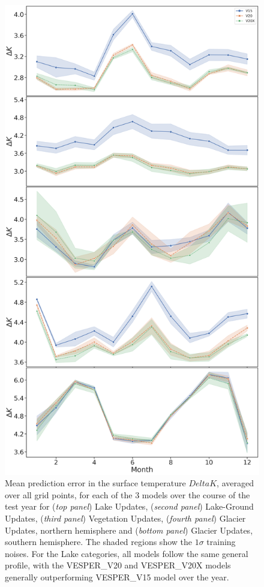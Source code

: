 \documentclass[hess, twostagejnl]{copernicus}
\begin{document}
	\begin{figure}
	\includegraphics[scale=0.2]{new_timeseries_noise}
	\caption{Mean prediction error in the surface temperature $Delta K$, averaged over all grid points, for each of the 3 models over the course of the test year for (\textit{top panel}) Lake Updates, (\textit{second panel}) Lake-Ground Updates, (\textit{third panel}) Vegetation Updates, (\textit{fourth panel}) Glacier Updates, northern hemisphere and (\textit{bottom panel}) Glacier Updates, southern hemisphere. The shaded regions show the $1 \sigma$ training noises. For the Lake categories, all models follow the same general profile, with the VESPER\_V20 and VESPER\_V20X models generally outperforming VESPER\_V15 model over the year.}
	\label{fig:timeseries}
\end{figure}
\end{document}
